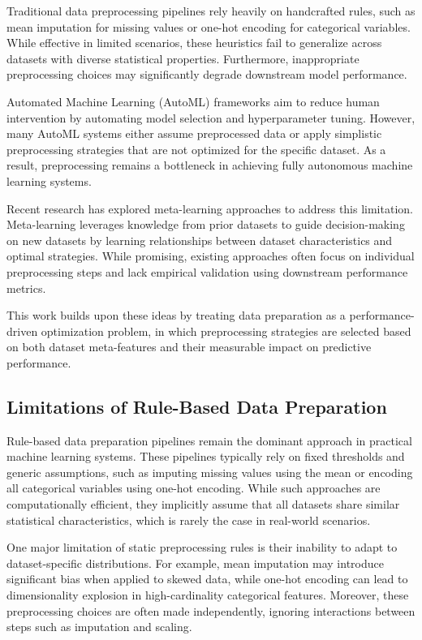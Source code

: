 \documentclass[11pt,a4paper]{article}
\begin{document}
Traditional data preprocessing pipelines rely heavily on handcrafted rules, such as mean imputation for missing values or one-hot encoding for categorical variables. While effective in limited scenarios, these heuristics fail to generalize across datasets with diverse statistical properties. Furthermore, inappropriate preprocessing choices may significantly degrade downstream model performance.

Automated Machine Learning (AutoML) frameworks aim to reduce human intervention by automating model selection and hyperparameter tuning. However, many AutoML systems either assume preprocessed data or apply simplistic preprocessing strategies that are not optimized for the specific dataset. As a result, preprocessing remains a bottleneck in achieving fully autonomous machine learning systems.

Recent research has explored meta-learning approaches to address this limitation. Meta-learning leverages knowledge from prior datasets to guide decision-making on new datasets by learning relationships between dataset characteristics and optimal strategies. While promising, existing approaches often focus on individual preprocessing steps and lack empirical validation using downstream performance metrics.

This work builds upon these ideas by treating data preparation as a performance-driven optimization problem, in which preprocessing strategies are selected based on both dataset meta-features and their measurable impact on predictive performance.


\subsection{Limitations of Rule-Based Data Preparation}

Rule-based data preparation pipelines remain the dominant approach in practical machine learning systems. These pipelines typically rely on fixed thresholds and generic assumptions, such as imputing missing values using the mean or encoding all categorical variables using one-hot encoding. While such approaches are computationally efficient, they implicitly assume that all datasets share similar statistical characteristics, which is rarely the case in real-world scenarios.

One major limitation of static preprocessing rules is their inability to adapt to dataset-specific distributions. For example, mean imputation may introduce significant bias when applied to skewed data, while one-hot encoding can lead to dimensionality explosion in high-cardinality categorical features. Moreover, these preprocessing choices are often made independently, ignoring interactions between steps such as imputation and scaling.
\end{document}
